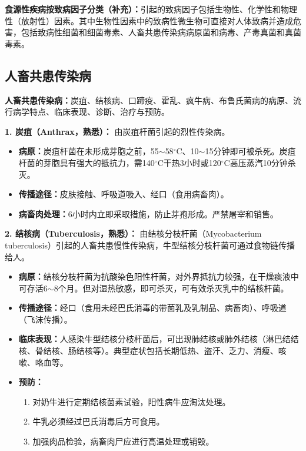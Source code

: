 \begin{tipbox}
\textbf{食源性疾病按致病因子分类（补充）：}引起的致病因子包括生物性、化学性和物理性（放射性）因素。其中生物性因素中的致病性微生物可直接对人体致病并造成危害，包括致病性细菌和细菌毒素、人畜共患传染病病原菌和病毒、产毒真菌和真菌毒素。
\end{tipbox}

\subsection{人畜共患传染病}

\begin{defbox}
\textbf{人畜共患传染病：}炭疽、结核病、口蹄疫、霍乱、疯牛病、布鲁氏菌病的病原、流行病学特点、临床表现、诊断、治疗与预防。

\textbf{1. 炭疽（Anthrax，熟悉）：}
由炭疽杆菌引起的烈性传染病。
\begin{itemize}[leftmargin=*]
    \item \textbf{病原：}炭疽杆菌在未形成芽胞之前，55$\sim$58$^\circ$C、10$\sim$15分钟即可被杀死。炭疽杆菌的芽胞具有强大的抵抗力，需140$^\circ$C干热3小时或120$^\circ$C高压蒸汽10分钟杀灭。
    \item \textbf{传播途径：}皮肤接触、呼吸道吸入、经口（食用病畜肉）。
    \item \textbf{病畜肉处理：}6小时内立即采取措施，防止芽孢形成。严禁屠宰和销售。
\end{itemize}

\textbf{2. 结核病（Tuberculosis，熟悉）：}
由结核分枝杆菌（Mycobacterium tuberculosis）引起的人畜共患慢性传染病，牛型结核分枝杆菌可通过食物链传播给人。
\begin{itemize}[leftmargin=*]
    \item \textbf{病原：}结核分枝杆菌为抗酸染色阳性杆菌，对外界抵抗力较强，在干燥痰液中可存活6$\sim$8个月。但对湿热敏感，即可杀灭，可有效杀灭乳中的结核杆菌。
    \item \textbf{传播途径：}经口（食用未经巴氏消毒的带菌乳及乳制品、病畜肉）、呼吸道（飞沫传播）。
    \item \textbf{临床表现：}人感染牛型结核分枝杆菌后，可出现肺结核或肺外结核（淋巴结结核、骨结核、肠结核等）。典型症状包括长期低热、盗汗、乏力、消瘦、咳嗽、咯血等。
    \item \textbf{预防：}
    \begin{enumerate}
        \item 对奶牛进行定期结核菌素试验，阳性病牛应淘汰处理。
        \item 牛乳必须经过巴氏消毒后方可食用。
        \item 加强肉品检验，病畜肉尸应进行高温处理或销毁。
    \end{enumerate}
\end{itemize}


\end{defbox}
